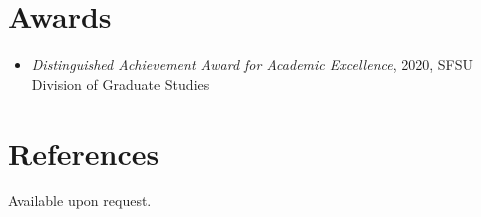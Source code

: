 \documentclass{article}
\begin{document}

\section*{Awards}
\begin{itemize}
    \item \textit{Distinguished Achievement Award for Academic Excellence}, 2020, SFSU Division of Graduate Studies
\end{itemize}






\section*{References}
Available upon request.
\end{document}
